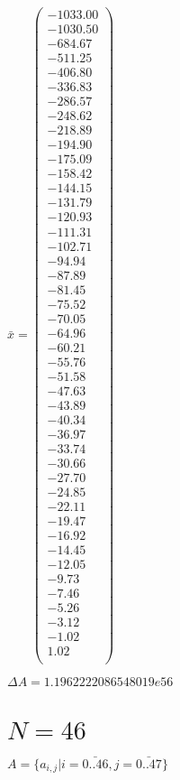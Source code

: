 \documentclass[a4paper,12pt]{article}
\begin{document}
$\bar { x } = \begin{pmatrix}
-1033.00 \\
-1030.50 \\
-684.67 \\
-511.25 \\
-406.80 \\
-336.83 \\
-286.57 \\
-248.62 \\
-218.89 \\
-194.90 \\
-175.09 \\
-158.42 \\
-144.15 \\
-131.79 \\
-120.93 \\
-111.31 \\
-102.71 \\
-94.94 \\
-87.89 \\
-81.45 \\
-75.52 \\
-70.05 \\
-64.96 \\
-60.21 \\
-55.76 \\
-51.58 \\
-47.63 \\
-43.89 \\
-40.34 \\
-36.97 \\
-33.74 \\
-30.66 \\
-27.70 \\
-24.85 \\
-22.11 \\
-19.47 \\
-16.92 \\
-14.45 \\
-12.05 \\
-9.73 \\
-7.46 \\
-5.26 \\
-3.12 \\
-1.02 \\
1.02 \\
\end{pmatrix}
$

$\Delta A = 1.1962222086548019e56$



\section{ $N = 46$ }
$A = \{ a _{ i, j } | i = \bar { 0..46 }, j = \bar { 0..47 } \}$
\end{document}
